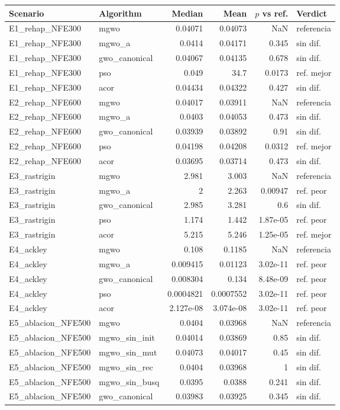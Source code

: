 \begin{tabular}{llrrrl}
\hline
Scenario & Algorithm & Median & Mean & $p$ vs ref. & Verdict \\
\hline
E1\_rehap\_NFE300 & mgwo & 0.04071 & 0.04073 & NaN & referencia \\
E1\_rehap\_NFE300 & mgwo\_a & 0.0414 & 0.04171 & 0.345 & sin dif. \\
E1\_rehap\_NFE300 & gwo\_canonical & 0.04067 & 0.04135 & 0.678 & sin dif. \\
E1\_rehap\_NFE300 & pso & 0.049 & 34.7 & 0.0173 & ref. mejor \\
E1\_rehap\_NFE300 & acor & 0.04434 & 0.04322 & 0.427 & sin dif. \\
\hline
E2\_rehap\_NFE600 & mgwo & 0.04017 & 0.03911 & NaN & referencia \\
E2\_rehap\_NFE600 & mgwo\_a & 0.0403 & 0.04053 & 0.473 & sin dif. \\
E2\_rehap\_NFE600 & gwo\_canonical & 0.03939 & 0.03892 & 0.91 & sin dif. \\
E2\_rehap\_NFE600 & pso & 0.04198 & 0.04208 & 0.0312 & ref. mejor \\
E2\_rehap\_NFE600 & acor & 0.03695 & 0.03714 & 0.473 & sin dif. \\
\hline
E3\_rastrigin & mgwo & 2.981 & 3.003 & NaN & referencia \\
E3\_rastrigin & mgwo\_a & 2 & 2.263 & 0.00947 & ref. peor \\
E3\_rastrigin & gwo\_canonical & 2.985 & 3.281 & 0.6 & sin dif. \\
E3\_rastrigin & pso & 1.174 & 1.442 & 1.87e-05 & ref. peor \\
E3\_rastrigin & acor & 5.215 & 5.246 & 1.25e-05 & ref. mejor \\
\hline
E4\_ackley & mgwo & 0.108 & 0.1185 & NaN & referencia \\
E4\_ackley & mgwo\_a & 0.009415 & 0.01123 & 3.02e-11 & ref. peor \\
E4\_ackley & gwo\_canonical & 0.008304 & 0.134 & 8.48e-09 & ref. peor \\
E4\_ackley & pso & 0.0004821 & 0.0007552 & 3.02e-11 & ref. peor \\
E4\_ackley & acor & 2.127e-08 & 3.074e-08 & 3.02e-11 & ref. peor \\
\hline
E5\_ablacion\_NFE500 & mgwo & 0.0404 & 0.03968 & NaN & referencia \\
E5\_ablacion\_NFE500 & mgwo\_sin\_init & 0.04014 & 0.03869 & 0.85 & sin dif. \\
E5\_ablacion\_NFE500 & mgwo\_sin\_mut & 0.04073 & 0.04017 & 0.45 & sin dif. \\
E5\_ablacion\_NFE500 & mgwo\_sin\_rec & 0.0404 & 0.03968 & 1 & sin dif. \\
E5\_ablacion\_NFE500 & mgwo\_sin\_busq & 0.0395 & 0.0388 & 0.241 & sin dif. \\
E5\_ablacion\_NFE500 & gwo\_canonical & 0.03983 & 0.03925 & 0.345 & sin dif. \\
\hline
\end{tabular}
